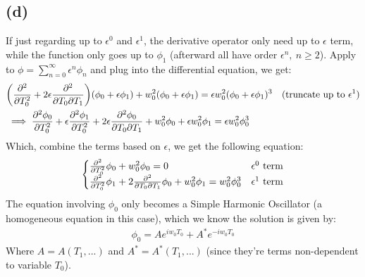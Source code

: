 \documentclass{article}
\DeclarePairedDelimiter{\paran}{(}{)}%
\begin{document}
\subsection*{(d)}
If just regarding up to $\epsilon^0$ and $\epsilon^1$, the derivative operator only need up to $\epsilon$ term, while the function only goes up to $\phi_1$ (afterward all have order $\epsilon^n,\ n\geq 2$). Apply to $\phi=\sum_{n=0}^{\infty}\epsilon^n\phi_n$ and plug into the differential equation, we get:
\begin{align}
    &\paran*{\frac{\partial^2}{\partial T_0^2}+2\epsilon\frac{\partial^2}{\partial T_0\partial T_1}}(\phi_0+\epsilon\phi_1) + w_0^2(\phi_0+\epsilon \phi_1) =\epsilon w_0^2(\phi_0+\epsilon\phi_1)^3\quad\textmd{(truncate up to }\epsilon^1) \\
    &\implies \frac{\partial^2\phi_0}{\partial T_0^2}+\epsilon\frac{\partial^2\phi_1}{\partial T_0^2} + 2\epsilon\frac{\partial^2\phi_0}{\partial T_0\partial T_1} + w_0^2\phi_0+\epsilon w_0^2\phi_1 = \epsilon w_0^2\phi_0^3
\end{align}
Which, combine the terms based on $\epsilon$, we get the following equation:
\begin{align}
    \begin{cases}
        \frac{\partial^2}{\partial T_0^2}\phi_0 + w_0^2\phi_0 = 0 & \epsilon^0 \textmd{ term}\\
        \frac{\partial^2}{\partial T_0^2}\phi_1 + 2\frac{\partial^2}{\partial T_0\partial T_1}\phi_0 + w_0^2\phi_1 = w_0^2\phi_0^3 & \epsilon^1 \textmd{ term}
    \end{cases}
\end{align}
The equation involving $\phi_0$ only becomes a Simple Harmonic Oscillator (a homogeneous equation in this case), which we know the solution is given by:
\begin{align}
    \phi_0 = Ae^{iw_0T_0}+A^*e^{-iw_0T_0}
\end{align}
Where $A=A(T_1,...)$ and $A^*=A^*(T_1,...)$ (since they're terms non-dependent to variable $T_0$).
\end{document}
